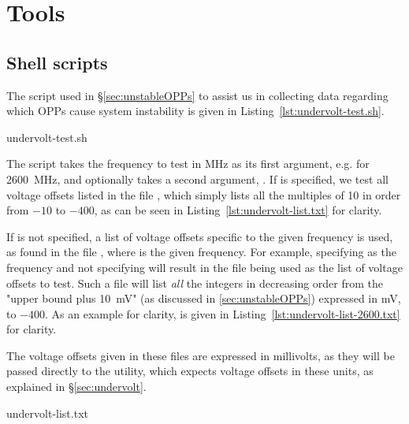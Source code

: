 \section{Tools}
\label{sec:tools}

\subsection{Shell scripts}
\label{sec:undervolt-test.sh}

The script used in §\ref{sec:unstableOPPs} to assist us in collecting data
regarding which OPPs cause system instability is given in
Listing~\ref{lst:undervolt-test.sh}.


    {undervolt-test.sh}

The script takes the frequency to test in MHz as its first argument, e.g.
 for 2600~MHz, and optionally takes a second argument, .
If  is specified, we test all voltage offsets listed in the file
, which simply lists all the multiples of 10 in order
from $-10$ to $-400$, as can be seen in Listing~\ref{lst:undervolt-list.txt}
for clarity.

If  is not specified, a list of voltage offsets specific
to the given frequency is used, as found in the file
, where  is the given
frequency. For example, specifying  as the frequency and not
specifying  will result in the file 
being used as the list of voltage offsets to test. Such a file will list
\emph{all} the integers in decreasing order from the "upper bound plus 10~mV"
(as discussed in \ref{sec:unstableOPPs}) expressed in mV, to $-400$. As an
example for clarity,  is given in
Listing~\ref{lst:undervolt-list-2600.txt} for clarity.

The voltage offsets given in these files are expressed in millivolts, as they
will be passed directly to the  utility, which expects voltage
offsets in these units, as explained in §\ref{sec:undervolt}.


    {undervolt-list.txt}

